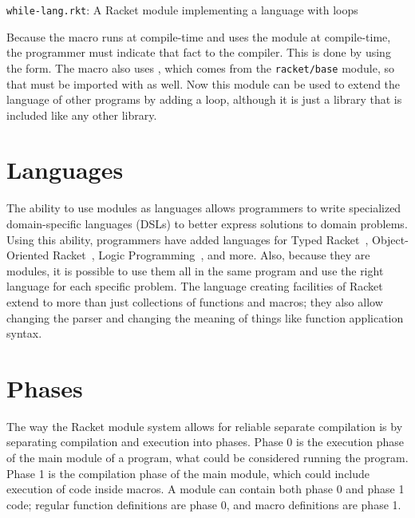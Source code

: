 \begin{listing}[tb]
  \inputminted{racket}{listings/while-lang.rkt}
  \caption{\texttt{while-lang.rkt}: A Racket module implementing a language with  loops}
  \label{lst:while-lang.rkt}
\end{listing}

Because the macro runs at compile-time and uses the  module at compile-time, the programmer must indicate that fact to the compiler.
This is done by using the  form. 
The macro also uses , which comes from the \texttt{racket/base} module, so that must be imported with  as well.
Now this module can be used to extend the language of other programs by adding a  loop, although it is just a library that is included like any other library.

\section{Languages}
The ability to use modules as languages allows programmers to write specialized domain-specific languages (DSLs) to better express solutions to domain problems. 
Using this ability, programmers have added languages for Typed Racket~\cite{typed}, Object-Oriented Racket~\cite{oo}, Logic Programming~\cite{logic}, and more.
Also, because they are modules, it is possible to use them all in the same program and use the right language for each specific problem.
The language creating facilities of Racket extend to more than just collections of functions and macros; they also allow changing the parser and changing the meaning of things like function application syntax. 

\section{Phases}

The way the Racket module system allows for reliable separate compilation is by separating compilation and execution into phases.
Phase 0 is the execution phase of the main module of a program, what could be considered running the program.
Phase 1 is the compilation phase of the main module, which could include execution of code inside macros. 
A module can contain both phase 0 and phase 1 code; regular function definitions are phase 0, and macro definitions are phase 1.

